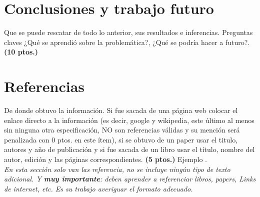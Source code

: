 \documentclass[journal, 10pt]{IEEEtran}
\begin{document}
\section{Conclusiones y trabajo futuro}

Que se puede rescatar de todo lo anterior, sus resultados e inferencias. Preguntas claves ¿Qué se aprendió sobre la problemática?, ¿Qué se podría hacer a futuro?. \textbf{(10 ptos.)}

\section{Referencias}

De donde obtuvo la información. Si fue sacada de una página web colocar el enlace directo a la información (es decir, google y wikipedia, este último al menos sin ninguna otra especificación, NO son referencias válidas y su mención será penalizada con 0 ptos. en este ítem), si se obtuvo de un paper usar el titulo, autores y año de publicación y si fue sacada de un libro usar el título, nombre del autor, edición y las páginas correspondientes. \textbf{(5 ptos.)} Ejemplo \cite{Winston:1994} \cite{HillierLiebermann:1991}.\\

\textit{En esta sección solo van las referencia, no se incluye ningún tipo de texto adicional. Y \textbf{muy importante}: deben aprender a referenciar libros, papers, Links de internet, etc. Es su trabajo averiguar el formato adecuado.}



\end{document}
